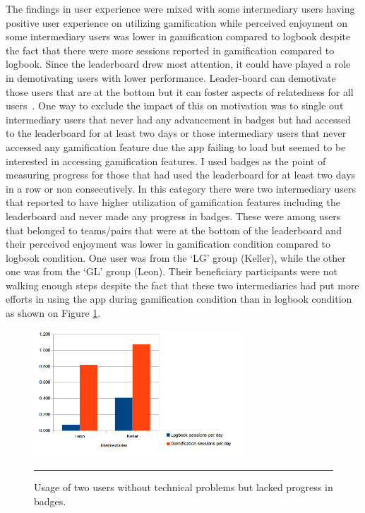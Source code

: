The findings in user experience were mixed with some intermediary users having positive user experience on utilizing gamification while perceived enjoyment on some intermediary users was lower in gamification compared to logbook despite the fact that there were more sessions reported in gamification compared to logbook. Since the leaderboard drew most attention, it could have played a role in demotivating users with lower performance. Leader-board can demotivate those users that are at the bottom but it can foster aspects of relatedness for all users~\citep{sailer2013:psychological}. One way to exclude the impact of this on motivation was to single out intermediary users that never had any advancement in badges but had accessed to the leaderboard for at least two days or those intermediary users that never accessed any gamification feature due the app failing to load but seemed to be interested in accessing gamification features. I used badges as the point of measuring progress for those that had used the leaderboard for at least two days in a row or non consecutively. In this category there were two intermediary users that reported to have higher utilization of gamification features including the leaderboard and never made any progress in badges. These were among users that belonged to teams/pairs that were at the bottom of the leaderboard and their perceived enjoyment was lower in gamification condition compared to logbook condition.  One user was from the `LG' group (Keller), while the other one was from the `GL' group (Leon).  Their beneficiary participants were not walking enough steps despite the fact that these two intermediaries had put  more efforts in using the app during gamification condition than in logbook condition as shown on Figure \ref{figure:badge_failure_2}. 
\begin{figure}[htbp]
  \centering
    \includegraphics[width=0.7\textwidth]{Figures/badgesfailures2.png}
    \rule{35em}{0.5pt}
  \caption{Usage of two users without technical problems but lacked progress in badges.}
  \label{figure:badge_failure_2}
\end{figure} 


